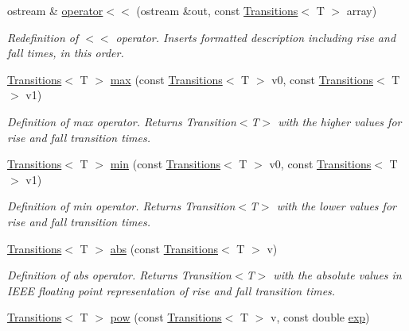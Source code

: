 \begin{DoxyCompactItemize}
\item 
ostream \& \hyperlink{classTransitions_a1f38245bca1673c266b44e9e2107c13d}{operator$<$$<$} (ostream \&out, const \hyperlink{classTransitions}{Transitions}$<$ T $>$ array)
\begin{DoxyCompactList}\small\item\em Redefinition of $<$$<$ operator. Inserts formatted description including rise and fall times, in this order. \end{DoxyCompactList}\item 
\hyperlink{classTransitions}{Transitions}$<$ T $>$ \hyperlink{classTransitions_af72b4da733791d7d350ed72162d8ea0f}{max} (const \hyperlink{classTransitions}{Transitions}$<$ T $>$ v0, const \hyperlink{classTransitions}{Transitions}$<$ T $>$ v1)
\begin{DoxyCompactList}\small\item\em Definition of max operator. Returns Transition$<$\-T$>$ with the higher values for rise and fall transition times. \end{DoxyCompactList}\item 
\hyperlink{classTransitions}{Transitions}$<$ T $>$ \hyperlink{classTransitions_aff6065ed38f85bcd39d2c2f8ce45f1d9}{min} (const \hyperlink{classTransitions}{Transitions}$<$ T $>$ v0, const \hyperlink{classTransitions}{Transitions}$<$ T $>$ v1)
\begin{DoxyCompactList}\small\item\em Definition of min operator. Returns Transition$<$\-T$>$ with the lower values for rise and fall transition times. \end{DoxyCompactList}\item 
\hyperlink{classTransitions}{Transitions}$<$ T $>$ \hyperlink{classTransitions_a3b968e944feed8bcb98aa1e6286fe175}{abs} (const \hyperlink{classTransitions}{Transitions}$<$ T $>$ v)
\begin{DoxyCompactList}\small\item\em Definition of abs operator. Returns Transition$<$\-T$>$ with the absolute values in I\-E\-E\-E floating point representation of rise and fall transition times. \end{DoxyCompactList}\item 
\hyperlink{classTransitions}{Transitions}$<$ T $>$ \hyperlink{classTransitions_a34f2a85ed601558365305cdcab645914}{pow} (const \hyperlink{classTransitions}{Transitions}$<$ T $>$ v, const double \hyperlink{classTransitions_ac02e6f8b007f44d55ed6b202c18ac0f8}{exp})

\end{DoxyCompactItemize}
